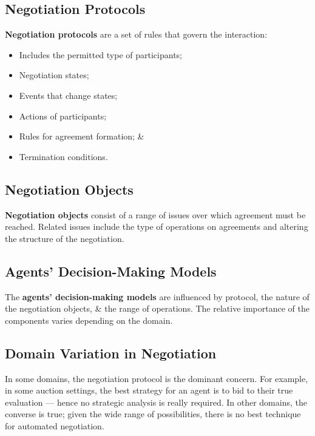 \documentclass[a4paper,11pt]{article}
\begin{document}
\subsection{Negotiation Protocols}
\textbf{Negotiation protocols} are a set of rules that govern the interaction:
\begin{itemize}
    \item   Includes the permitted type of participants;
    \item   Negotiation states;
    \item   Events that change states;
    \item   Actions of participants;
    \item   Rules for agreement formation; \&
    \item   Termination conditions.
\end{itemize}

\subsection{Negotiation Objects}
\textbf{Negotiation objects} consist of a range of issues over which agreement must be reached.
Related issues include the type of operations on agreements and altering the structure of the negotiation. 

\subsection{Agents' Decision-Making Models}
The \textbf{agents' decision-making models} are influenced by protocol, the nature of the negotiation objects, \& the range of operations.
The relative importance of the components varies depending on the domain.

\subsection{Domain Variation in Negotiation}
In some domains, the negotiation protocol is the dominant concern.
For example, in some auction settings, the best strategy for an agent is to bid to their true evaluation --- hence no strategic analysis is really required.
In other domains, the converse is true;
given the wide range of possibilities, there is no best technique for automated negotiation.
\end{document}

